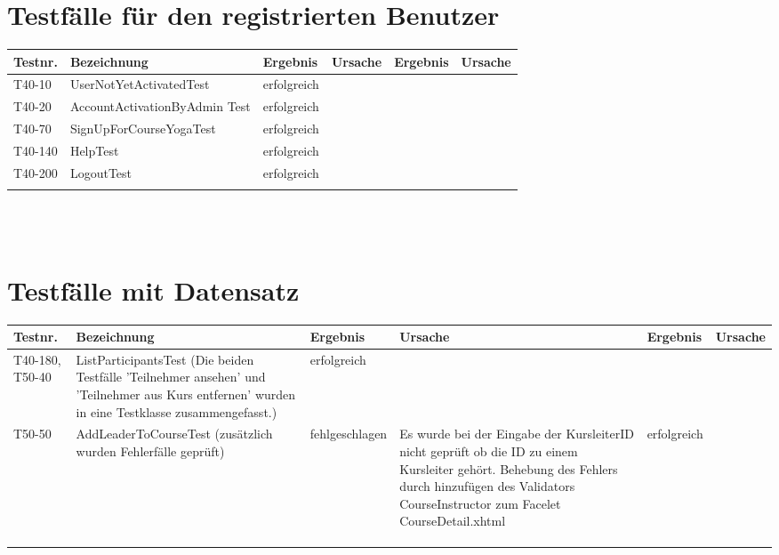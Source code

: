 \begin{landscape}
	\section{Testfälle für den registrierten Benutzer}
		\begin{tabular}{|p{2.0cm} |p{5.0cm}|p{3.0cm}|p{5.0cm}|p{4.0cm}|p{4.0cm}|}
			\hline \textbf{Testnr.} & \textbf{Bezeichnung} & \textbf{Ergebnis} & \textbf{Ursache} & \textbf{Ergebnis} & \textbf{Ursache} \\
			\hline T40-10   &  UserNotYetActivatedTest        & erfolgreich   &        &         &       \\
			\hline T40-20   & AccountActivationByAdmin Test  & erfolgreich    &        &         &       \\	
			\hline T40-70   & SignUpForCourseYogaTest & erfolgreich &        &         &       \\	
			\hline T40-140  & HelpTest & erfolgreich &        &         &       \\	
			\hline T40-200  & LogoutTest & erfolgreich &        &         &       \\	
			\hline       &          &          &        &         &       \\
			\hline 
		\end{tabular} \ \\
		\ \\
			
	\section{Testfälle mit Datensatz}	
		\begin{tabular}{|p{2.0cm} |p{5.0cm}|p{3.0cm}|p{5.0cm}|p{4.0cm}|p{4.0cm}|}
			\hline \textbf{Testnr.} & \textbf{Bezeichnung} & \textbf{Ergebnis} & \textbf{Ursache} & \textbf{Ergebnis} & \textbf{Ursache} \\
			\hline  T40-180, T50-40  & ListParticipantsTest (Die beiden Testfälle 'Teilnehmer ansehen' und 'Teilnehmer aus Kurs entfernen' wurden in eine Testklasse zusammengefasst.) &     erfolgreich     &        &         &       \\
			\hline  T50-50  &  AddLeaderToCourseTest (zusätzlich wurden Fehlerfälle geprüft) &  fehlgeschlagen & Es wurde bei der Eingabe der KursleiterID nicht geprüft ob die ID zu einem Kursleiter gehört. Behebung des Fehlers durch hinzufügen des Validators CourseInstructor zum Facelet CourseDetail.xhtml  &  erfolgreich       &       \\
			\hline       &          &          &        &         &       \\
			\hline       &          &          &        &         &       \\
			\hline       &          &          &        &         &       \\
			\hline 
		\end{tabular} \ \\
		\ \\
	
\end{landscape}